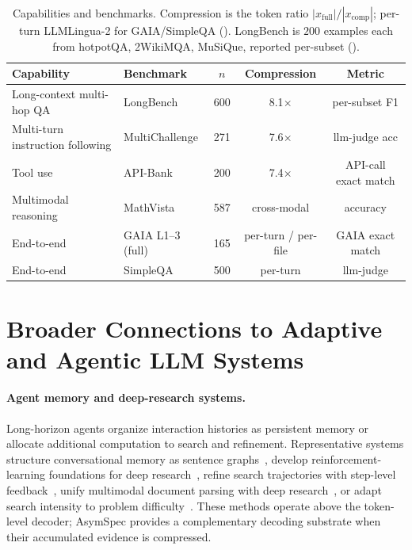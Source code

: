 \documentclass[11pt]{article}
\theoremstyle{plain}
\theoremstyle{definition}
\begin{document}
\begin{table}[t]
\centering
\footnotesize
\setlength{\tabcolsep}{6pt}
\begin{tabular}{llccc}
\toprule
Capability & Benchmark & $n$ & Compression & Metric \\
\midrule
Long-context multi-hop QA & LongBench & 600 & 8.1$\times$ & per-subset F1 \\
Multi-turn instruction following & MultiChallenge & 271 & 7.6$\times$ & llm-judge acc \\
Tool use & API-Bank & 200 & 7.4$\times$ & API-call exact match \\
Multimodal reasoning & MathVista & 587 & cross-modal & accuracy \\
\midrule
End-to-end  & GAIA L1--3 (full) & 165 & per-turn / per-file & GAIA exact match \\
End-to-end  & SimpleQA & 500 & per-turn & llm-judge \citep{wei2024simpleqa} \\
\bottomrule
\end{tabular}
\caption{Capabilities and benchmarks. Compression is the token ratio $|x_{\text{full}}|/|x_{\text{comp}}|$; per-turn LLMLingua-2 for GAIA/SimpleQA (). LongBench is $200$ examples each from hotpotQA, 2WikiMQA, MuSiQue, reported per-subset ().}
\label{tab:datasets}
\end{table}

\begingroup
\section{Broader Connections to Adaptive and Agentic LLM Systems}
\label{appx:broader-connections}

\paragraph{Agent memory and deep-research systems.}
Long-horizon agents organize interaction histories as persistent memory or allocate additional computation to search and refinement. Representative systems structure conversational memory as sentence graphs~\citep{wu-etal-2025-sgmem}, develop reinforcement-learning foundations for deep research~\citep{li-etal-2025-rlsurvey}, refine search trajectories with step-level feedback~\citep{DBLP:journals/corr/abs-2602-07773}, unify multimodal document parsing with deep research~\citep{DBLP:conf/www/DongHYHZLLYWWZL26}, or adapt search intensity to problem difficulty~\citep{DBLP:journals/corr/abs-2505-24332}. These methods operate above the token-level decoder; AsymSpec provides a complementary decoding substrate when their accumulated evidence is compressed.
\end{document}
